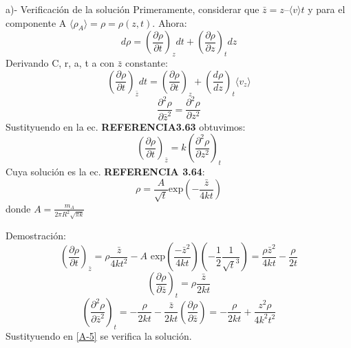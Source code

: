     a)- Verificación de la solución
    \newline
    Primeramente, considerar que $\bar{z}=z–\langle v\rangle t$ y para el componente A $\langle \rho_A \rangle=\rho =\rho (z,t)$. Ahora:
    \begin{equation*}
        d\rho=\left(\frac{\partial\rho}{\partial t}\right)_zdt+\left(\frac{\partial\rho}{\partial z}\right)_tdz
    \end{equation*}
    Derivando C, r, a, t a con $\bar{z}$ constante:
    \begin{equation*}
        \left(\frac{\partial\rho}{\partial t}\right)_{\bar{z}}dt=\left(\frac{\partial\rho}{\partial t}\right)_z+\left(\frac{d\rho}{dz}\right)_t\langle v_z\rangle
    \end{equation*}
    \begin{equation*}
        \frac{\partial^2 \rho}{\partial \bar{z}^2}=\frac{\partial^2 \rho}{\partial z^2}
    \end{equation*}
    Sustityuendo en la ec. \textbf{REFERENCIA3.63} obtuvimos:
    \begin{equation*}
            \left(\frac{\partial\rho}{\partial t}\right)_{\bar{z}}=k\left(\frac{\partial^2 \rho}{\partial z^2}\right)_t
            \tag{A-5}
            \label{A-5}
    \end{equation*}
    Cuya solución es la ec. \textbf{REFERENCIA 3.64}:
    \begin{equation*}
        \rho=\frac{A}{\sqrt{t}}\text{exp}\left(-\frac{\bar{z}}{4kt}\right)
    \end{equation*}
    donde $A=\frac{m_A}{2\pi R^2 \sqrt{\pi k}}$
    
    \vspace{1 cm}
    Demostración:
    \begin{equation*}
         \left(\frac{\partial\rho}{\partial t}\right)_{\bar{z}}=\rho \frac{\bar{z}}{4kt^2}-A\text{ exp}\left(\frac{-\bar{z}^2}{4kt} \right) \left(-\frac{1}{2}\frac{1}{\sqrt{t}^3} \right)=\frac{\rho \bar{z}^2}{4kt}-\frac{\rho}{2t}
    \end{equation*}
    \begin{equation*}
         \left(\frac{\partial\rho}{\partial {\bar{z}}}\right)_t=\rho \frac{\bar{z}}{2kt}
    \end{equation*}
    \begin{equation*}
        \left( \frac{\partial^2 \rho}{\partial \bar{z}^2}\right)_t=-\frac{\rho}{2kt}-\frac{\bar{z}}{2kt} \left( \frac{\partial \rho}{\partial {\bar{z}}}\right)=-\frac{\rho}{2kt}+\frac{z^2 \rho}{4k^2t^2}
    \end{equation*}
    Sustityuendo en \eqref{A-5} se verifica la solución.\\

